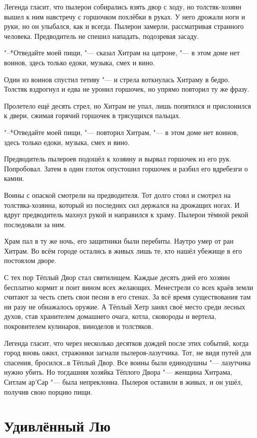 \documentclass[a4paper,10pt,fleqn]{book}
\begin{document}
Легенда гласит, что пылерои собирались взять двор с ходу, но толстяк-хозяин вышел к ним навстречу с горшочком похлёбки в руках.
У него дрожали ноги и руки, но он улыбался, как и всегда.
Пылерои замерли, рассматривая странного человека.
Предводитель не спешил нападать, подозревая засаду.

"--*Отведайте моей пищи, "--- сказал Хитрам на цатроне, "--- в этом доме нет воинов, здесь только едоки, музыка, смех и вино.

Один из воинов спустил тетиву "--- и стрела воткнулась Хитраму в бедро.
Толстяк вздрогнул и едва не уронил горшочек, но упрямо повторил ту же фразу.

Пролетело ещё десять стрел, но Хитрам не упал, лишь попятился и прислонился к двери, сжимая горячий горшочек в трясущихся пальцах.

"--*Отведайте моей пищи, "--- повторил Хитрам, "--- в этом доме нет воинов, здесь только едоки, музыка, смех и вино.

Предводитель пылероев подошёл к хозяину и вырвал горшочек из его рук.
Попробовал.
Затем в один глоток опустошил горшочек и разбил его вдребезги о камни.

Воины с опаской смотрели на предводителя.
Тот долго стоял и смотрел на толстяка-хозяина, который из последних сил держался на дрожащих ногах.
И вдруг предводитель махнул рукой и направился к храму.
Пылерои тёмной рекой последовали за ним.

Храм пал в ту же ночь, его защитники были перебиты.
Наутро умер от ран Хитрам.
Во всём городе остались в живых лишь те, кто нашёл убежище в его постоялом дворе.

С тех пор Тёплый Двор стал святилищем.
Каждые десять дней его хозяин бесплатно кормит и поит вином всех желающих.
Менестрели со всех краёв земли считают за честь спеть свои песни в его стенах.
За всё время существования там ни разу не обнажалось оружие.
А Тёплый Хетр занял своё место среди лесных духов, став хранителем домашнего очага, котла, сковороды и вертела, покровителем кулинаров, виноделов и толстяков.

Легенда гласит, что через несколько десятков дождей после этих событий, когда город вновь ожил, стражники загнали пылероя-лазутчика.
Тот, не видя путей для спасения, бросился\dots в Тёплый Двор.
Все воины были единодушны "--- лазутчика нужно убить. Но тогдашняя хозяйка Тёплого Двора "--- женщина Хитрама, Ситлам ар’Сар "--- была непреклонна.
Пылероя оставили в живых, и он ушёл, получив свою порцию пищи.

\section{Удивлённый Лю}
\end{document}
